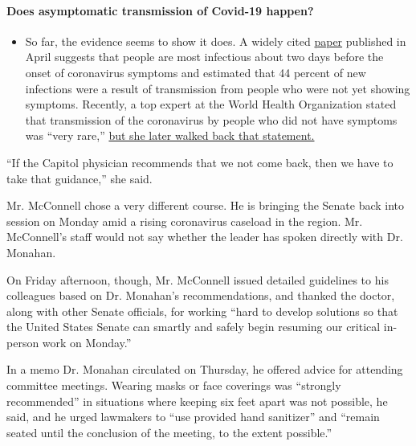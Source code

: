 \begin{itemize}
{  \paragraph{Does asymptomatic transmission of Covid-19
  happen?}\label{does-asymptomatic-transmission-of-covid-19-happen}}

  \begin{itemize}
  \tightlist
  \item
    So far, the evidence seems to show it does. A widely cited
    \href{https://www.nature.com/articles/s41591-020-0869-5}{paper}
    published in April suggests that people are most infectious about
    two days before the onset of coronavirus symptoms and estimated that
    44 percent of new infections were a result of transmission from
    people who were not yet showing symptoms. Recently, a top expert at
    the World Health Organization stated that transmission of the
    coronavirus by people who did not have symptoms was ``very rare,''
    \href{https://www.nytimes.com/2020/06/09/world/coronavirus-updates.html?action=click\&pgtype=Article\&state=default\&region=MAIN_CONTENT_3\&context=storylines_faq\#link-1f302e21}{but
    she later walked back that statement.}
  \end{itemize}
\end{itemize}

``If the Capitol physician recommends that we not come back, then we
have to take that guidance,'' she said.

Mr. McConnell chose a very different course. He is bringing the Senate
back into session on Monday amid a rising coronavirus caseload in the
region. Mr. McConnell's staff would not say whether the leader has
spoken directly with Dr. Monahan.

On Friday afternoon, though, Mr. McConnell issued detailed guidelines to
his colleagues based on Dr. Monahan's recommendations, and thanked the
doctor, along with other Senate officials, for working ``hard to develop
solutions so that the United States Senate can smartly and safely begin
resuming our critical in-person work on Monday.''

In a memo Dr. Monahan circulated on Thursday, he offered advice for
attending committee meetings. Wearing masks or face coverings was
``strongly recommended'' in situations where keeping six feet apart was
not possible, he said, and he urged lawmakers to ``use provided hand
sanitizer'' and ``remain seated until the conclusion of the meeting, to
the extent possible.''

